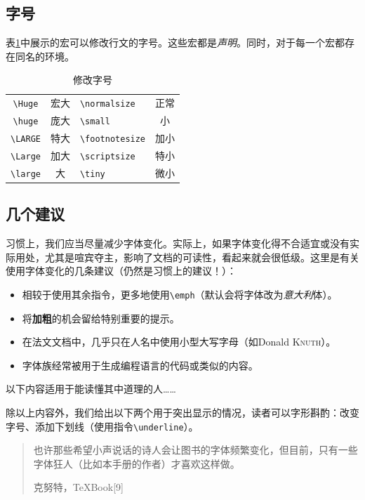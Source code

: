 \subsection{字号}

表\ref{tab:2.2}中展示的宏可以修改行文的字号。这些宏都是\emph{声明}。同时，对于每一个宏都存在同名的环境。

\begin{table}[ht]
    \centering
    \begin{tabular}{|c|c||l|c|}
\hline
\verb|\Huge| & {\Huge 宏大} & \verb|\normalsize| & {正常} \\
\verb|\huge| & {\huge 庞大} & \verb|\small| & {\small 小} \\
\verb|\LARGE| & {\LARGE 特大} & \verb|\footnotesize| & {\footnotesize 加小} \\
\verb|\Large| & {\Large 加大} & \verb|\scriptsize| & {\scriptsize 特小} \\
\verb|\large| & {\large 大} & \verb|\tiny| & {\tiny 微小} \\
\hline
    \end{tabular}
    \caption{修改字号}
    \label{tab:2.2}
\end{table}

\subsection{几个建议}

习惯上，我们应当尽量减少字体变化。实际上，如果字体变化得不合适宜或没有实际用处，尤其是喧宾夺主，影响了文档的可读性，看起来就会很低级。这里是有关使用字体变化的几条建议（仍然是习惯上的建议！）：
\begin{itemize}
    \item 相较于使用其余指令，更多地使用\verb+\emph+（默认会将字体改为\emph{意大利}体）。
    \item 将\textbf{加粗}的机会留给特别重要的提示。
    \item 在法文文档中，几乎只在人名中使用小型大写字母（如Donald \textsc{Knuth}）。
    \item {}字体族经常被用于生成编程语言的代码或类似的内容。
\end{itemize}

以下内容适用于能读懂其中道理的人……

除以上内容外，我们给出以下两个用于突出显示的情况，读者可以字形斟酌：改变字号、添加下划线（使用指令\verb|\underline|）。

\begin{quote}
    也许那些希望{\tiny 小声说话}的诗人会让图书的字体频繁变化，但目前，只有一些字体狂人{\tiny （比如本手册的作者）}才喜欢这样做。
    
    \hfill 克努特，\TeX Book[9]
\end{quote}

